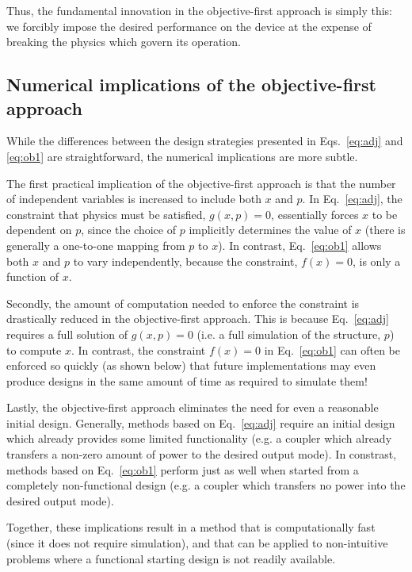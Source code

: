 \documentclass[letterpaper,10pt]{article}
\begin{document}
Thus, the fundamental innovation in the objective-first approach
    is simply this:
    we forcibly impose the desired performance on the device at the expense of
    breaking the physics which govern its operation.

\subsection{Numerical implications of the objective-first approach}

While the differences between the design strategies presented in 
    Eqs.~\ref{eq:adj} and \ref{eq:ob1} are straightforward,
    the numerical implications are more subtle.

The first practical implication of the objective-first approach 
    is that the number of independent variables is increased to include
    both $x$ and $p$.
In Eq.~\ref{eq:adj}, the constraint that physics must be satisfied, $g(x,p)=0$, 
    essentially forces $x$ to be dependent on $p$,
    since the choice of $p$ implicitly determines the value of $x$
    (there is generally a one-to-one mapping from $p$ to $x$).
In contrast, Eq.~\ref{eq:ob1} allows both $x$ and $p$ to vary independently,
    because the constraint, $f(x)=0$, is only a function of $x$.

Secondly, the amount of computation needed to enforce the constraint is
    drastically reduced in the objective-first approach.
This is because Eq.~\ref{eq:adj} requires a full solution of $g(x,p)=0$
    (i.e. a full simulation of the structure, $p$) to compute $x$.
In contrast, the constraint $f(x)=0$ in Eq.~\ref{eq:ob1} 
    can often be enforced so quickly (as shown below) that 
    future implementations may even produce designs in the same amount of time
    as required to simulate them!

Lastly, the objective-first approach eliminates the need for even a reasonable
    initial design.
Generally, methods based on Eq.~\ref{eq:adj} require an initial design which
    already provides some limited functionality
    (e.g. a coupler which already transfers 
    a non-zero amount of power to the desired output mode).
In constrast, methods based on Eq.~\ref{eq:ob1} perform just as well
    when started from a completely non-functional design 
    (e.g. a coupler which transfers no power into the desired output mode).

Together, these implications result in a method
    that is computationally fast (since it does not require simulation), and
    that can be applied to non-intuitive problems 
    where a functional starting design is not readily available.
\end{document}
